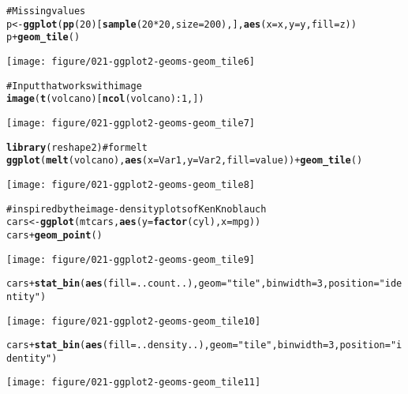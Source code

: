\documentclass[a4paper,titlepage]{tufte-handout}\usepackage{graphicx, color}
\makeatletter
\def\maxwidth{ %
  \ifdim\Gin@nat@width>\linewidth
    \linewidth
  \else
    \Gin@nat@width
  \fi
}
\newcommand{\hlfunctioncall}[1]{\textcolor[rgb]{0.501960784313725,0,0.329411764705882}{\textbf{#1}}}%
\newcommand{\hlstring}[1]{\textcolor[rgb]{0.6,0.6,1}{#1}}%
\newcommand{\hlcomment}[1]{\textcolor[rgb]{0.180392156862745,0.6,0.341176470588235}{#1}}%
\newenvironment{kframe}{%
 \def\at@end@of@kframe{}%
 \ifinner\ifhmode%
  \def\at@end@of@kframe{\end{minipage}}%
  \begin{minipage}{\columnwidth}%
 \fi\fi%
 \def\FrameCommand##1{\hskip\@totalleftmargin \hskip-\fboxsep
 \colorbox{shadecolor}{##1}\hskip-\fboxsep
     \hskip-\linewidth \hskip-\@totalleftmargin \hskip\columnwidth}%
 \MakeFramed {\advance\hsize-\width
   \@totalleftmargin\z@ \linewidth\hsize
   \@setminipage}}%
 {\par\unskip\endMakeFramed%
 \at@end@of@kframe}
\newenvironment{knitrout}{}{} %
\makeatother
\begin{document}
\begin{knitrout}
\begin{kframe}
\begin{alltt}
\hlcomment{# Missing values}
p <- \hlfunctioncall{ggplot}(\hlfunctioncall{pp}(20)[\hlfunctioncall{sample}(20*20, size=200),], \hlfunctioncall{aes}(x=x,y=y,fill=z))
p + \hlfunctioncall{geom_tile}()
\end{alltt}
\end{kframe}
\texttt{[image: figure/021-ggplot2-geoms-geom\_tile6]} 
\begin{kframe}\begin{alltt}

\hlcomment{# Input that works with image}
\hlfunctioncall{image}(\hlfunctioncall{t}(volcano)[\hlfunctioncall{ncol}(volcano):1,])
\end{alltt}
\end{kframe}
\texttt{[image: figure/021-ggplot2-geoms-geom\_tile7]} 
\begin{kframe}\begin{alltt}
\hlfunctioncall{library}(reshape2) \hlcomment{# for melt}
\hlfunctioncall{ggplot}(\hlfunctioncall{melt}(volcano), \hlfunctioncall{aes}(x=Var1, y=Var2, fill=value)) + \hlfunctioncall{geom_tile}()
\end{alltt}
\end{kframe}
\texttt{[image: figure/021-ggplot2-geoms-geom\_tile8]} 
\begin{kframe}\begin{alltt}

\hlcomment{# inspired by the image-density plots of Ken Knoblauch}
cars <- \hlfunctioncall{ggplot}(mtcars, \hlfunctioncall{aes}(y=\hlfunctioncall{factor}(cyl), x=mpg))
cars + \hlfunctioncall{geom_point}()
\end{alltt}
\end{kframe}
\texttt{[image: figure/021-ggplot2-geoms-geom\_tile9]} 
\begin{kframe}\begin{alltt}
cars + \hlfunctioncall{stat_bin}(\hlfunctioncall{aes}(fill=..count..), geom=\hlstring{"tile"}, binwidth=3, position=\hlstring{"identity"})
\end{alltt}
\end{kframe}
\texttt{[image: figure/021-ggplot2-geoms-geom\_tile10]} 
\begin{kframe}\begin{alltt}
cars + \hlfunctioncall{stat_bin}(\hlfunctioncall{aes}(fill=..density..), geom=\hlstring{"tile"}, binwidth=3, position=\hlstring{"identity"})
\end{alltt}
\end{kframe}
\texttt{[image: figure/021-ggplot2-geoms-geom\_tile11]} 
\begin{kframe}\begin{alltt}


\end{alltt}
\end{kframe}
\end{knitrout}
\end{document}
